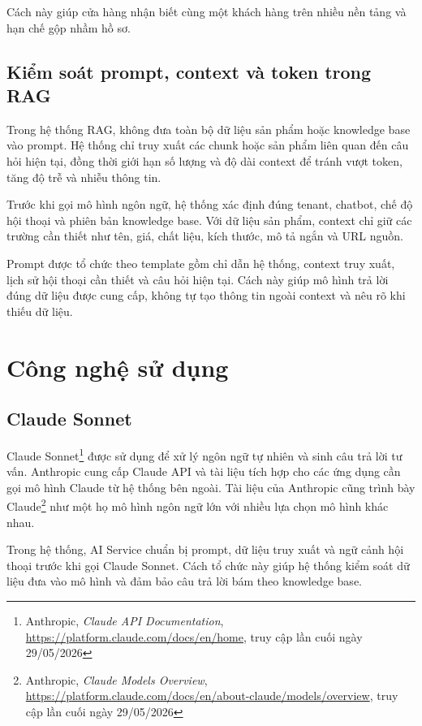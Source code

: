 \documentclass[../DoAn.tex]{subfiles}
\begin{document}
Cách này giúp cửa hàng nhận biết cùng một khách hàng trên nhiều nền tảng và hạn chế gộp nhầm hồ sơ.

\subsection{Kiểm soát prompt, context và token trong RAG}
\label{subsection:3.1.5}

Trong hệ thống RAG, không đưa toàn bộ dữ liệu sản phẩm hoặc knowledge base vào prompt. Hệ thống chỉ truy xuất các chunk hoặc sản phẩm liên quan đến câu hỏi hiện tại, đồng thời giới hạn số lượng và độ dài context để tránh vượt token, tăng độ trễ và nhiễu thông tin.

Trước khi gọi mô hình ngôn ngữ, hệ thống xác định đúng tenant, chatbot, chế độ hội thoại và phiên bản knowledge base. Với dữ liệu sản phẩm, context chỉ giữ các trường cần thiết như tên, giá, chất liệu, kích thước, mô tả ngắn và URL nguồn.

Prompt được tổ chức theo template gồm chỉ dẫn hệ thống, context truy xuất, lịch sử hội thoại cần thiết và câu hỏi hiện tại. Cách này giúp mô hình trả lời đúng dữ liệu được cung cấp, không tự tạo thông tin ngoài context và nêu rõ khi thiếu dữ liệu.


\section{Công nghệ sử dụng}
\label{section:3.2}

\subsection{Claude Sonnet}
\label{subsection:3.2.1}

Claude Sonnet\footnote{Anthropic, \textit{Claude API Documentation}, \url{https://platform.claude.com/docs/en/home}, truy cập lần cuối ngày 29/05/2026} được sử dụng để xử lý ngôn ngữ tự nhiên và sinh câu trả lời tư vấn. Anthropic cung cấp Claude API và tài liệu tích hợp cho các ứng dụng cần gọi mô hình Claude từ hệ thống bên ngoài. Tài liệu của Anthropic cũng trình bày Claude\footnote{Anthropic, \textit{Claude Models Overview}, \url{https://platform.claude.com/docs/en/about-claude/models/overview}, truy cập lần cuối ngày 29/05/2026} như một họ mô hình ngôn ngữ lớn với nhiều lựa chọn mô hình khác nhau.

Trong hệ thống, AI Service chuẩn bị prompt, dữ liệu truy xuất và ngữ cảnh hội thoại trước khi gọi Claude Sonnet. Cách tổ chức này giúp hệ thống kiểm soát dữ liệu đưa vào mô hình và đảm bảo câu trả lời bám theo knowledge base.
\end{document}
